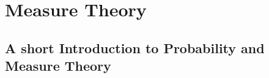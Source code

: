 \chapter[Measure Theory]{Measure Theory}
\label{ch:Measure}

\section{A short Introduction to Probability and Measure Theory}